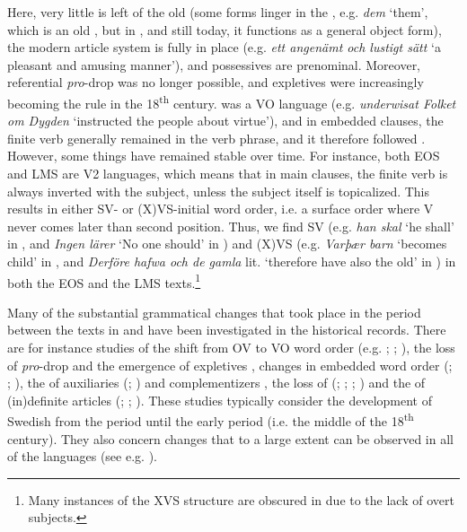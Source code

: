 \documentclass[output=paper]{langscibook}
\begin{document}
Here, very little is left of the old  (some forms linger in the , e.g. \textit{dem} ‘them’, which is an old , but in , and still today, it functions as a general object form), the modern article system is fully in place (e.g. \textit{ett angenämt och lustigt sätt} ‘a pleasant and amusing manner’), and possessives are prenominal. Moreover, referential \textit{pro}{}-drop was no longer possible, and expletives were increasingly becoming the rule in the 18\textsuperscript{th} century.  was a VO language (e.g. \textit{underwisat Folket om Dygden} ‘instructed the people about virtue’), and in embedded clauses, the finite verb generally remained in the verb phrase, and it therefore followed . However, some things have remained stable over time. For instance, both EOS and LMS are V2 languages, which means that in main clauses, the finite verb is always inverted with the subject, unless the subject itself is topicalized. This results in either SV- or (X)VS-initial word order, i.e. a surface order where V never comes later than second position. Thus, we find SV (e.g. \textit{han skal} ‘he shall’ in , and \textit{Ingen lärer} ‘No one should’ in ) and (X)VS (e.g. \textit{Varþær barn} ‘becomes child’ in , and \textit{Derföre hafwa och de gamla} lit. ‘therefore have also the old’ in ) in both the EOS and the LMS texts.\footnote{Many instances of the XVS structure are obscured in  due to the lack of overt subjects.}



Many of the substantial grammatical changes that took place in the period between the texts in  and  have been investigated in the historical records. There are for instance studies of the shift from OV to VO word order (e.g. \citealt{Delsing1999}; \citealt{Petzell2011}; \citealt{Sangfelt2019}), the loss of \textit{pro}{}-drop \citep{Hakansson2008} and the emergence of expletives \citep{Falk1993}, changes in embedded word order (\citealt{Platzack1988centralskandinaviska}; \citealt{Falk1993}; \citealt{Hakansson2011}), the  of auxiliaries (\citealt{Andersson2007}; \citealt{Bylin2013}) and complementizers \citep{Rosenkvist2004}, the loss of  (\citealt{Delsing1991,Delsing2014Studier,Delsing1991}; \citealt{Norde1997}; \citealt{Falk1997}; \citealt{Skrzypek2005}) and the  of (in)definite articles (\citealt{Skrzypek2009}; \citealt{BrandtlerDelsing2010}; \citealt{Stroh-Wollin2016}). These studies typically consider the development of Swedish from the  period until the early  period (i.e. the middle of the 18\textsuperscript{th} century). They also concern changes that to a large extent can be observed in all of the  languages (see e.g. \citealt{HolmbergPlatzack1995}).
\end{document}
